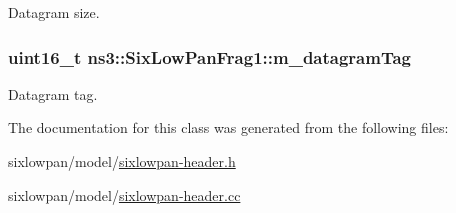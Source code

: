 Datagram size. 

\subsubsection[{\texorpdfstring{m\+\_\+datagram\+Tag}{m_datagramTag}}]{\setlength{\rightskip}{0pt plus 5cm}uint16\+\_\+t ns3\+::\+Six\+Low\+Pan\+Frag1\+::m\+\_\+datagram\+Tag\hspace{0.3cm}{\ttfamily [private]}}\hypertarget{classns3_1_1SixLowPanFrag1_ae0b93fdfa788a977987ea41447088529}{}\label{classns3_1_1SixLowPanFrag1_ae0b93fdfa788a977987ea41447088529}


Datagram tag. 



The documentation for this class was generated from the following files\+:\begin{DoxyCompactItemize}
\item 
sixlowpan/model/\hyperlink{sixlowpan-header_8h}{sixlowpan-\/header.\+h}\item 
sixlowpan/model/\hyperlink{sixlowpan-header_8cc}{sixlowpan-\/header.\+cc}\end{DoxyCompactItemize}
